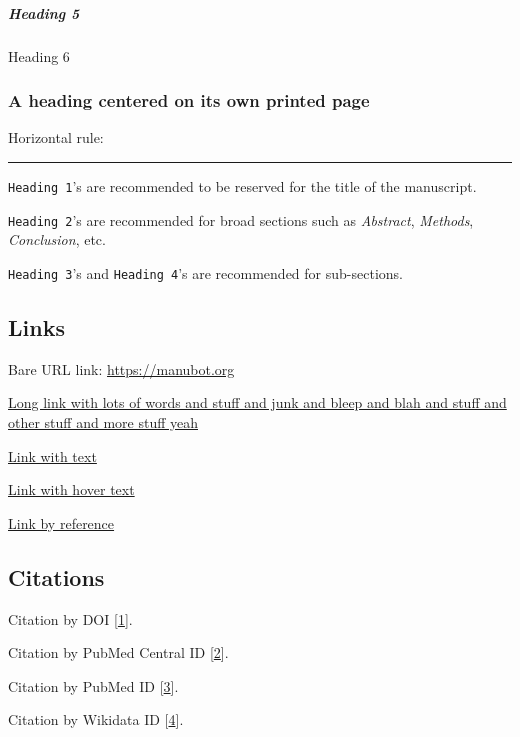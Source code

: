 \hypertarget{heading-5}{%
\subparagraph{Heading 5}\label{heading-5}}

Heading 6

\hypertarget{a-heading-centered-on-its-own-printed-page}{%
\subsubsection{A heading centered on its own printed page}\label{a-heading-centered-on-its-own-printed-page}}

Horizontal rule:

\begin{center}\rule{0.5\linewidth}{0.5pt}\end{center}

\texttt{Heading\ 1}'s are recommended to be reserved for the title of the manuscript.

\texttt{Heading\ 2}'s are recommended for broad sections such as \emph{Abstract}, \emph{Methods}, \emph{Conclusion}, etc.

\texttt{Heading\ 3}'s and \texttt{Heading\ 4}'s are recommended for sub-sections.

\hypertarget{links}{%
\subsection{Links}\label{links}}

Bare URL link: \url{https://manubot.org}

\href{https://manubot.org}{Long link with lots of words and stuff and junk and bleep and blah and stuff and other stuff and more stuff yeah}

\href{https://manubot.org}{Link with text}

\href{https://manubot.org}{Link with hover text}

\href{https://manubot.org}{Link by reference}

\hypertarget{citations}{%
\subsection{Citations}\label{citations}}

Citation by DOI {[}\protect\hyperlink{ref-IhliSZDo}{1}{]}.

Citation by PubMed Central ID {[}\protect\hyperlink{ref-mSMVRkoc}{2}{]}.

Citation by PubMed ID {[}\protect\hyperlink{ref-126Wi5Us4}{3}{]}.

Citation by Wikidata ID {[}\protect\hyperlink{ref-QhC8yJ7V}{4}{]}.

